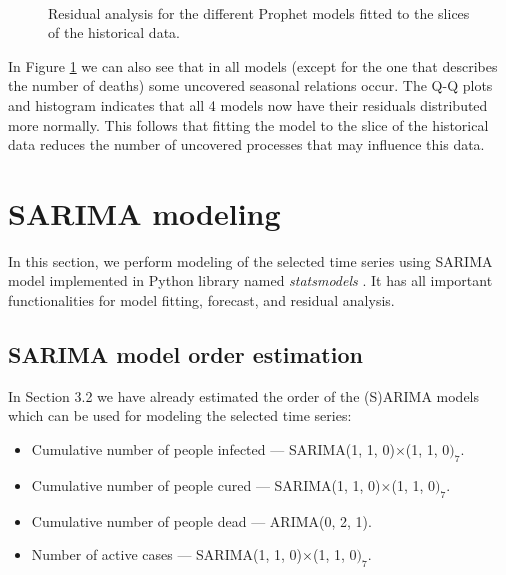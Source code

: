 \begin{figure}[!ht]
 \\
\caption{Residual analysis for the different Prophet models fitted to the slices of the historical data.}
\label{fig:resid_prophet_slices}
\end{figure}

In Figure \ref{fig:resid_prophet_slices} we can also see that in all models (except for the one that describes the number of deaths) some uncovered seasonal relations occur. The Q-Q plots and histogram indicates that all 4 models now have their residuals distributed more normally. This follows that fitting the model to the slice of the historical data reduces the number of uncovered processes that may influence this data.



\hypertarget{s3.4}{\section{SARIMA modeling}}

In this section, we perform modeling of the selected time series using SARIMA model implemented in Python library named \textit{statsmodels} \cite{seabold2010statsmodels}. It has all important functionalities for model fitting, forecast, and residual analysis.

\subsection{SARIMA model order estimation}

In Section \hypertarget{s3.2}{3.2} we have already estimated the order of the (S)ARIMA models which can be used for modeling the selected time series:
\begin{itemize}
    \item Cumulative number of people infected --- SARIMA(1, 1, 0)$\times$(1, 1, 0$)_7$.
    \item Cumulative number of people cured --- SARIMA(1, 1, 0)$\times$(1, 1, 0$)_7$.
    \item Cumulative number of people dead --- ARIMA(0, 2, 1).
    \item Number of active cases --- SARIMA(1, 1, 0)$\times$(1, 1, 0$)_7$.
\end{itemize}

